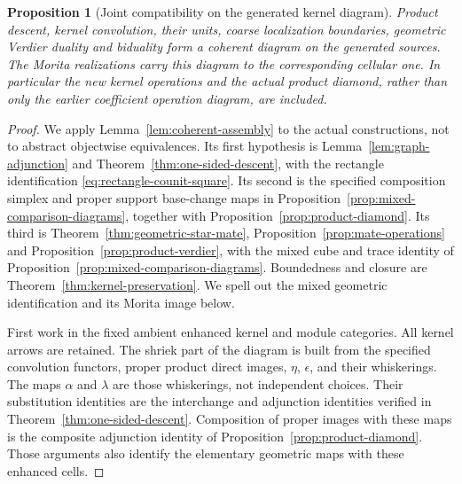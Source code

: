 \documentclass[11pt]{article}
\newtheorem{proposition}{Proposition}[section]
\theoremstyle{definition}
\theoremstyle{remark}
\begin{document}
\begin{proposition}[Joint compatibility on the generated kernel diagram]
\label{thm:joint-kernel-diagram}
Product descent, kernel convolution, their units, coarse localization
boundaries, geometric Verdier duality and biduality form a coherent
diagram on the generated sources.  The Morita realizations carry this
diagram to the corresponding cellular one.  In particular the new
kernel operations and the actual product diamond, rather than only
the earlier coefficient operation diagram, are included.
\end{proposition}
\begin{proof}
We apply Lemma~\ref{lem:coherent-assembly} to the actual
constructions, not to abstract objectwise equivalences.  Its first
hypothesis is Lemma~\ref{lem:graph-adjunction} and
Theorem~\ref{thm:one-sided-descent}, with the rectangle identification
\eqref{eq:rectangle-counit-square}.  Its second is the specified composition simplex and proper support
base-change maps in Proposition~\ref{prop:mixed-comparison-diagrams},
together with Proposition~\ref{prop:product-diamond}.  Its third is
Theorem~\ref{thm:geometric-star-mate},
Proposition~\ref{prop:mate-operations} and
Proposition~\ref{prop:product-verdier}, with the mixed cube and
trace identity of Proposition~\ref{prop:mixed-comparison-diagrams}.
Boundedness and closure are
Theorem~\ref{thm:kernel-preservation}.  We spell out the mixed
geometric identification and its Morita image below.

First work in the fixed ambient enhanced kernel and module categories.
All kernel arrows are retained.  The shriek part of the diagram is
built from the specified convolution functors, proper product direct
images, $\eta$, $\epsilon$, and their whiskerings.  The maps
$\alpha$ and $\lambda$ are those whiskerings, not independent
choices.  Their substitution identities are the interchange and
adjunction identities verified in Theorem~\ref{thm:one-sided-descent}.
Composition of proper images with these maps is the composite
adjunction identity of Proposition~\ref{prop:product-diamond}.
Those arguments also identify the elementary geometric maps with
these enhanced cells.


\end{proof}
\end{document}
